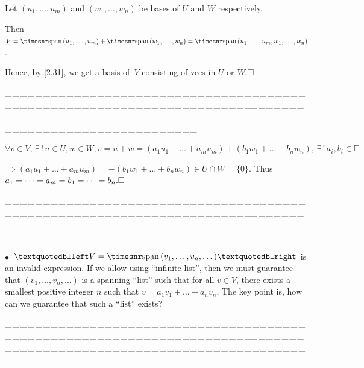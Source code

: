 \documentclass[a4paper, 11pt, UTF8]{article}
\def\i{{\timesnr\textup{i}}}
\def\Spn{{\timesnr\textup{span}}\,}
\def\Fbb{{\mathbb{F}}}
\def\Rbb{{\mathbb{R}}}
\def\Cbb{{\mathbb{C}}}
\def\BulletPoint{{\small$\bullet$}}
\def\ProblemEnding{{\tiny \_\,\_\,\_\,\_\,\_\,\_\,\_\,\_\,\_\,\_\,\_\,\_\,\_\,\_\,\_\,\_\,\_\,\_\,\_\,\_\,\_\,\_\,\_\,\_\,\_\,\_\,\_\,\_\,\_\,\_\,\_\,\_\,\_\,\_\,\_\,\_\,\_\,\_\,\_\,\_\,\_\,\_\,\_\,\_\,\_\,\_\,\_\,\_\,\_\,\_\,\_\,\_\,\_\,\_\,\_\,\_\,\_\,\_\,\_\,\_\,\_\,\_\,\_\,\_\,\_\,\_\,\_\,\_\,\_\,\_\,\_\_\,\_\,\_\,\_\,\_\,\_\,\_\,\_\,\_\,\_\,\_\,\_\,\_\,\_\,\_\,\_\,\_\,\_\,\_\,\_\,\_\,\_\,\_\,\_\,\_\,\_\,\_\,\_\,\_\,\_\,\_\,\_\,\_\,\_\,\_\,\_\,\_\,\_\,\_\,\_\,\_\,\_\,\_\,\_\,\_\,\_\,\_\,\_\,\_\,\_\,\_\,\_\,\_\,\_\,\_\,\_\,\_\,\_\,\_\,\_\,\_\,\_\,\_\,\_\,\_\,\_\,\_\,\_\,\_\,\_\,\_}}
\def\ChapterEnding{\rightline{\timesbfx\Large{E{\small NDED}}}\par\vspace{6pt}}
\begin{document}
\begin{large}
Let $(u_1,\dots,u_m)$ and $(w_1,\dots,w_n)$ be bases of $U$ and $W$ respectively.\par\quad
Then $V=\Spn(u_1,\dots,u_m)+\Spn(w_1,\dots,w_n)=\Spn(u_1,\dots,u_m,w_1,\dots,w_n)$.\par\quad
Hence, by [2.31], we get a basis of \,$V$ consisting of vecs in $U$ or $W.\hfill\square$\par
\ProblemEnding\par

\par\quad
$\forall v\in V,\,\exists\,!\,u\in U,w\in W,v=u+w=(a_1 u_1+\dots+a_m u_m)+(b_1 w_1+\dots+b_n w_n),\,\exists\,!\,a_i,b_i\in\Fbb$\par\quad
$\Rightarrow (a_1 u_1+\dots+a_m u_m)=-(b_1 w_1+\dots+b_n w_n)\in U\cap W=\{0\}$. Thus $a_1=\dots=a_m=b_1=\dots=b_n.\hfill\square$\par
\ProblemEnding\par


\BulletPoint \,\hspace{1pt}\TextB{}
$“V=\Spn(v_1,\dots,v_n,\dots)”$ is an invalid expression.\TextB{}
If we allow using $“$infinite list$”$, then we must guarantee that $(v_1,\dots,v_n,\dots)$ is a spanning $“$list$”$\TextB{}
such that for all $v\in V$, there exists a smallest positive integer $n$ such that $v=a_1 v_1+\dots+a_n v_n$,\TextB{}
The key point is, how can we guarantee that such a $“$list$”$ exists?\par
\ProblemEnding\par
\ChapterEnding


\end{large}
\end{document}
